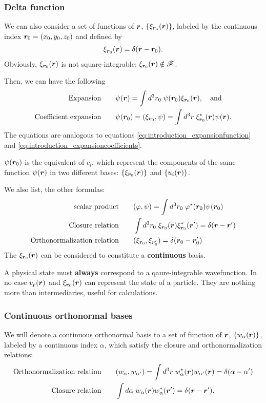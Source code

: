 \subsubsection{Delta function}
We can also consider a set of functions of $\bm{r}$, $\{\xi_{\bm{r}_o}(\bm{r})\}$, labeled by the continuous index $\bm{r}_0=(x_0,y_0,z_0)$ and defined by
\begin{align}
    \xi_{\bm{r}_0}(\bm{r})=\delta(\bm{r}-\bm{r}_0).
\end{align}
Obviously, $\xi_{\bm{r}_0}(\bm{r})$ is not square-integrable: $\xi_{\bm{r}_0}(\bm{r})\notin\mathscr{F}$.

Then, we can have the following
\begin{align}
    \text{Expansion}&\qquad\psi(\bm{r})=\int d^3r_0\;\psi(\bm{r}_0)\xi_{\bm{r}_0}(\bm{r}),\quad\text{and}\\
    \text{Coefficient expansion}&\qquad\psi(\bm{r}_0)=(\xi_{\bm{r}_0},\psi)=\int d^3r\;\xi^*_{\bm{r}_0}(\bm{r})\psi(\bm{r}).
\end{align}
The equations are analogous to equations \eqref{eq:introduction_expansionfunction} and \eqref{eq:introduction_expansioncoefficients}.
\begin{emphasizer}
    $\psi(\bm{r}_0)$ is the equivalent of $c_i$, which represent the components of the same function $\psi(\bm{r})$ in two different bases: $\{\xi_{\bm{r}_0}(\bm{r})\}$ 
    and $\{u_i(\bm{r})\}$.
\end{emphasizer}
We also list, the other formulas:
\begin{align}
    \text{scalar product}&\qquad(\varphi,\psi)=\int d^3r_0\;\varphi^*(\bm{r}_0)\psi(\bm{r}_0)\\
    \text{Closure relation}&\qquad\int d^3r_0\;\xi_{\bm{r}_0}(\bm{r})\xi^*_{\bm{r}_0}(\bm{r}')=\delta(\bm{r}-\bm{r}')\\
    \text{Orthonormalization relation}&\qquad (\xi_{\bm{r}_0},\xi_{\bm{r}'_0})=\delta(\bm{r}_0-\bm{r}'_0)
\end{align}
The $\xi_{\bm{r}_0}(\bm{r})$ can be considered to constitute a \textbf{continuous} basis.

\begin{emphasizer}
    A physical state must \textbf{always} correspond to a qaure-integrable wavefunction. In no case $v_p(\bm{r})$ and $\xi_{\bm{r}_0}(\bm{r})$ can represent the state of a 
    particle. They are nothing more than intermediaries, useful for calculations.
\end{emphasizer}
\subsubsection{Continuous orthonormal bases}
We will denote a continuous orthonormal basis to a set of function of $\bm{r}$, $\{w_\alpha(\bm{r})\}$, labeled by a continuous index $\alpha$, which satisfy the 
closure and orthonormalization relations:
\begin{align}
    \text{Orthonormalization relation}&\qquad(w_\alpha,w_{\alpha'})=\int d^3r\;w^*_\alpha(\bm{r})w_{\alpha'}(\bm{r})=\delta(\alpha-\alpha')\\
    \text{Closure relation}&\qquad\int d\alpha\;w_\alpha(\bm{r})w^*_\alpha(\bm{r}')=\delta(\bm{r}-\bm{r}').
\end{align}

